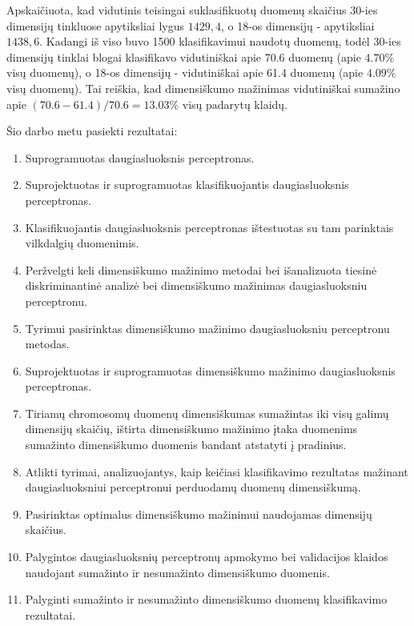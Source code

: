 \documentclass{VUMIFPSbakalaurinis}
\begin{document}
Apskaičiuota, kad vidutinis teisingai suklasifikuotų duomenų skaičius 30-ies dimensijų tinkluose apytiksliai lygus $1429,4$, o 18-os dimensijų - apytiksliai $1438,6$.
Kadangi iš viso buvo 1500 klasifikavimui naudotų duomenų, todėl 30-ies dimensijų tinklai blogai klasifikavo vidutiniškai apie 70.6 duomenų (apie $4.70\%$ visų duomenų), o 18-os dimensijų - vidutiniškai apie 61.4 duomenų (apie $4.09\%$ visų duomenų).
Tai reiškia, kad dimensiškumo mažinimas vidutiniškai sumažino apie $(70.6 - 61.4) / 70.6 = 13.03\%$ visų padarytų klaidų.



\clearpage
{}

Šio darbo metu pasiekti rezultatai:
\begin{enumerate}
	\item Suprogramuotas daugiasluoksnis perceptronas.
	\item Suprojektuotas ir suprogramuotas klasifikuojantis daugiasluoksnis perceptronas.
	\item Klasifikuojantis daugiasluoksnis perceptronas ištestuotas su tam parinktais vilkdalgių duomenimis.

	\item Peržvelgti keli dimensiškumo mažinimo metodai bei išanalizuota tiesinė diskriminantinė analizė bei dimensiškumo mažinimas daugiasluoksniu perceptronu.
	\item Tyrimui pasirinktas dimensiškumo mažinimo daugiasluoksniu perceptronu metodas.
	\item Suprojektuotas ir suprogramuotas dimensiškumo mažinimo daugiasluoksnis perceptronas.
	\item Tiriamų chromosomų duomenų dimensiškumas sumažintas iki visų galimų dimensijų skaičių, ištirta dimensiškumo mažinimo įtaka duomenims sumažinto dimensiškumo duomenis bandant atstatyti į pradinius.

	\item Atlikti tyrimai, analizuojantys, kaip keičiasi klasifikavimo rezultatas mažinant daugiasluoksniui perceptronui perduodamų duomenų dimensiškumą.
	\item Pasirinktas optimalus dimensiškumo mažinimui naudojamas dimensijų skaičius.
	
	\item Palygintos daugiasluoksnių perceptronų apmokymo bei validacijos klaidos naudojant sumažinto ir nesumažinto dimensiškumo duomenis.
	\item Palyginti sumažinto ir nesumažinto dimensiškumo duomenų klasifikavimo rezultatai.
\end{enumerate}
\end{document}
